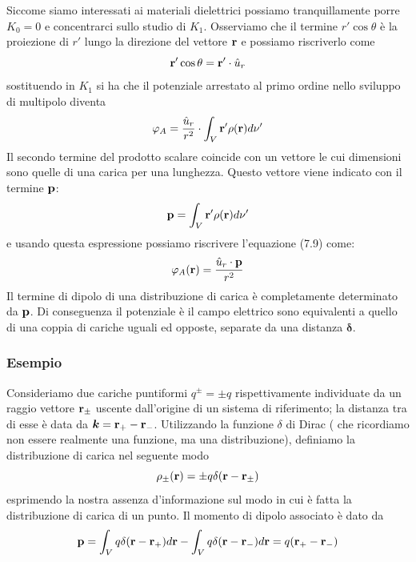 Siccome siamo interessati ai materiali dielettrici possiamo tranquillamente porre $K_0 = 0$ e concentrarci sullo studio di $K_1$. Osserviamo che il termine $r' \cos\theta $ \`e la proiezione di $r'$ lungo la direzione del vettore $\bold{r}$ e possiamo riscriverlo come 
\begin{equation*}
	\bold{r'} \cos \theta = \bold{r}' \cdot \hat{u}_{r}
\end{equation*}
sostituendo in $K_1$ si ha che il potenziale arrestato al primo ordine nello sviluppo di multipolo diventa 
\begin{equation}
	\varphi_{A} =  \frac{\hat{u}_{r}}{r^2} \cdot \int_{V} \bold{r}' \rho(\bold{r}) d \nu' 
\end{equation}
Il secondo termine del prodotto scalare coincide con un vettore le cui dimensioni sono quelle di una carica per una lunghezza. Questo vettore viene indicato con il termine $\bold{p}$:
\begin{equation}
	\bold{p} = \int_{V} \bold{r}' \rho(\bold{r}) d\nu'
\end{equation} 
e usando questa espressione possiamo riscrivere l'equazione (7.9) come:
\begin{equation}
	\varphi_{A}(\bold{r}) = \frac{\hat{u}_{r} \cdot \bold{p}}{r^2}
\end{equation}
Il termine di dipolo di una distribuzione di carica \`e completamente determinato da $\bold{p}$. Di conseguenza il potenziale \`e il campo elettrico sono equivalenti a quello di una coppia di cariche uguali ed opposte, separate da una distanza $\bm{\delta}$.

\subsubsection{Esempio}

Consideriamo due cariche puntiformi $q^{\pm } = \pm q$ rispettivamente individuate da un raggio vettore $\bold{r}_{\pm}$ uscente dall'origine di un sistema di riferimento; la distanza tra di esse \`e data da $\bm{k} = \bold{r}_{+} - \bold{r}_{-}$. Utilizzando la funzione $\delta$ di Dirac ( che ricordiamo non essere realmente una funzione, ma una distribuzione), definiamo la distribuzione di carica nel seguente modo
\begin{equation*}
	\rho_{\pm}(\bold{r}) = \pm q \delta(\bold{r} - \bold{r}_{\pm})
\end{equation*}  
esprimendo la nostra assenza d'informazione sul modo in cui \`e fatta la distribuzione di carica di un punto. Il momento di dipolo associato \`e dato da 
\begin{equation*}
	\bold{p} = \int_{V} q \delta(\bold{r}- \bold{r}_{+})d\bold{r} - \int_{V} q \delta(\bold{r}-\bold{r}_{-})d\bold{r} = q(\bold{r}_{+} - \bold{r}_{-})
\end{equation*}


